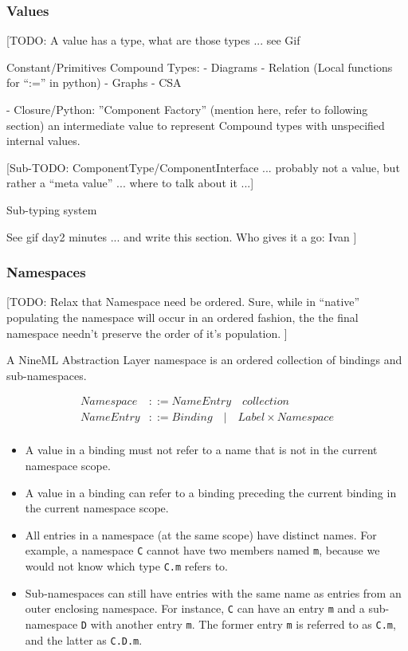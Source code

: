 \documentclass[a4paper]{article}
\begin{document}
\subsubsection{Values}

[TODO: A value has a type, what are those types ... see Gif

Constant/Primitives
Compound Types:
- Diagrams
- Relation (Local functions for ``:='' in python)
- Graphs
- CSA

- Closure/Python: ''Component Factory'' (mention here, refer to following section)
  an intermediate value to represent Compound types with
  unspecified internal values.


[Sub-TODO: ComponentType/ComponentInterface ... probably not a
value, but rather a ``meta value'' ... where to talk about it ...]


Sub-typing system

See gif day2 minutes ... and write this section.
Who gives it a go: Ivan
]

\subsubsection{Namespaces}

[TODO: Relax that Namespace need be ordered.  Sure, while in ``native'' populating
the namespace will occur in an ordered fashion, the the final namespace
needn't preserve the order of it's population. ]

A NineML Abstraction Layer namespace is an ordered collection of
bindings and sub-namespaces.

\begin{equation*}
\begin{array}{ll}
   Namespace & ::= NameEntry \quad collection \\
   NameEntry & ::= Binding \quad  \lvert \quad Label \times Namespace \\
\end{array}
\end{equation*}

\begin{itemize}
\item A value in a binding must not refer to a name that is not in the
  current namespace scope.
\item A value in a binding can refer to a binding preceding the current binding in the
  current namespace scope.
\item All entries in a namespace (at the same scope) have distinct
  names. For example, a namespace \verb^C^ cannot have two members
  named \verb^m^, because we would not know which type \verb^C.m^
  refers to.
\item Sub-namespaces can still have entries with the same name as
  entries from an outer enclosing namespace. For instance, \verb^C^
  can have an entry \verb^m^ and a sub-namespace \verb^D^ with another
  entry \verb^m^.  The former entry \verb^m^ is referred to as
  \verb^C.m^, and the latter as \verb^C.D.m^.
\end{itemize}
\end{document}
